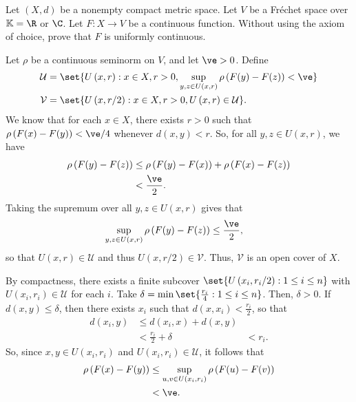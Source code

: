 \documentclass[10pt]{mypackage}
\begin{document}
\begin{problem}[Problem II.5]
  Let $\left( X,d \right)$ be a nonempty compact metric space. Let $V$ be a Fréchet space over $ \mathbb{K} = \R $ or $ \C $. Let $F\colon X\to V$ be a continuous function. Without using the axiom of choice, prove that $F$ is uniformly continuous.
\end{problem}
\begin{solution}
  Let $\rho$ be a continuous seminorm on $V$, and let $\ve > 0$. Define
  \begin{align*}
    \mathcal{U} &= \set{U\left( x,r \right) : x\in X, r > 0,\sup_{y,z\in U\left( x,r \right)}\rho\left( F(y) - F(z)\right) < \ve}\\
    \mathcal{V} &= \set{U\left( x,r/2 \right) : x\in X,r > 0, U\left( x,r \right)\in \mathcal{U}}.
  \end{align*}
  We know that for each $x\in X$, there exists $r > 0$ such that $\rho\left( F(x)-F(y) \right) < \ve/4$ whenever $d\left( x,y \right) < r$. So, for all $y,z\in U\left( x,r \right)$, we have
  \begin{align*}
    \rho\left( F(y)-F(z) \right) &\leq \rho\left( F(y)-F(x) \right) + \rho\left( F(x)-F(z) \right)\\
                                 &< \frac{\ve}{2}.
  \end{align*}
  Taking the supremum over all $y,z\in U\left( x,r \right)$ gives that 
  \begin{align*}
    \sup_{y,z\in U\left( x,r \right)} \rho\left( F(y)-F(z) \right) &\leq \frac{\ve}{2},
  \end{align*}
  so that $U\left( x,r \right)\in \mathcal{U}$ and thus $U\left( x,r/2 \right)\in \mathcal{V}$. Thus, $\mathcal{V}$ is an open cover of $X$.

  By compactness, there exists a finite subcover $\set{U\left( x_i,r_i/2 \right) : 1\leq i \leq n}$ with $U\left( x_i,r_i \right)\in \mathcal{U}$ for each $i$. Take $\delta = \min\set{\frac{r_i}{4} : 1\leq i \leq n}$. Then, $\delta > 0$. If $d\left( x,y \right)\leq \delta$, then there exists $x_i$ such that $d\left( x,x_i \right) < \frac{r_i}{2}$, so that
  \begin{align*}
    d\left( x_i,y \right) &\leq d\left( x_i,x \right) + d\left( x,y \right)\\
                          &< \frac{r_i}{2} + \delta
                          &< r_i.
  \end{align*}
  So, since $x,y\in U\left( x_i,r_i \right)$ and $U\left( x_i,r_i \right)\in \mathcal{U}$, it follows that
  \begin{align*}
    \rho\left( F(x)-F(y) \right) &\leq \sup_{u,v\in U\left( x_i,r_i \right)} \rho\left( F(u)-F(v) \right)\\
                                 &< \ve.
  \end{align*}
\end{solution}
\end{document}
